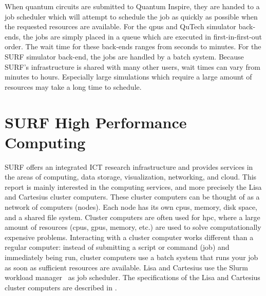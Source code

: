 When quantum circuits are submitted to Quantum Inspire, they are handed to a job scheduler which will attempt to schedule the job as quickly as possible when the requested resources are available.
For the \glspl{qpu} and QuTech simulator back-ends, the jobs are simply placed in a queue which are executed in first-in-first-out order.
The wait time for these back-ends ranges from seconds to minutes.
For the SURF simulator back-end, the jobs are handled by a batch system.
Because SURF's infrastructure is shared with many other users, wait times can vary from minutes to hours.
Especially large simulations which require a large amount of resources may take a long time to schedule.

\section{SURF High Performance Computing}
SURF offers an integrated ICT research infrastructure and provides services in the areas of computing, data storage, visualization, networking, and cloud.
This report is mainly interested in the computing services, and more precisely the Lisa and Cartesius cluster computers.
These cluster computers can be thought of as a network of computers (nodes).
Each node has its own \glspl{cpu}, memory, disk space, and a shared file system.
Cluster computers are often used for \acrfull{hpc}, where a large amount of resources (\glspl{cpu}, \glspl{gpu}, memory, etc.) are used to solve computationally expensive problems.
Interacting with a cluster computer works different than a regular computer: instead of submitting a script or command (job) and immediately being run, cluster computers use a batch system that runs your job as soon as sufficient resources are available.
Lisa and Cartesius use the Slurm workload manager~\cite{yoo2003slurm} as job scheduler.
The specifications of the Lisa and Cartesius cluster computers are described in .
